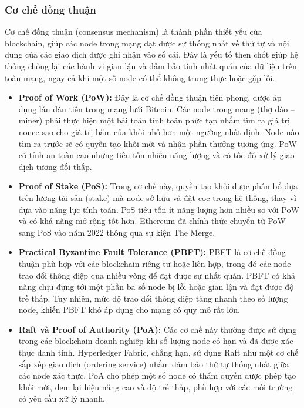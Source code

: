 \subsubsection{Cơ chế đồng thuận}

Cơ chế đồng thuận (consensus mechanism) là thành phần thiết yếu của blockchain, giúp các node trong mạng đạt được sự thống nhất về thứ tự và nội dung của các giao dịch được ghi nhận vào sổ cái. Đây là yếu tố then chốt giúp hệ thống chống lại các hành vi gian lận và đảm bảo tính nhất quán của dữ liệu trên toàn mạng, ngay cả khi một số node có thể không trung thực hoặc gặp lỗi.

\begin{itemize}
    \item \textbf{Proof of Work (PoW):} Đây là cơ chế đồng thuận tiên phong, được áp dụng lần đầu tiên trong mạng lưới Bitcoin. Các node trong mạng (thợ đào -- miner) phải thực hiện một bài toán tính toán phức tạp nhằm tìm ra giá trị nonce sao cho giá trị băm của khối nhỏ hơn một ngưỡng nhất định. Node nào tìm ra trước sẽ có quyền tạo khối mới và nhận phần thưởng tương ứng. PoW có tính an toàn cao nhưng tiêu tốn nhiều năng lượng và có tốc độ xử lý giao dịch tương đối thấp.

    \item \textbf{Proof of Stake (PoS):} Trong cơ chế này, quyền tạo khối được phân bổ dựa trên lượng tài sản (stake) mà node sở hữu và đặt cọc trong hệ thống, thay vì dựa vào năng lực tính toán. PoS tiêu tốn ít năng lượng hơn nhiều so với PoW và có khả năng mở rộng tốt hơn. Ethereum đã chính thức chuyển từ PoW sang PoS vào năm 2022 thông qua sự kiện The Merge.

    \item \textbf{Practical Byzantine Fault Tolerance (PBFT):} PBFT là cơ chế đồng thuận phù hợp với các blockchain riêng tư hoặc liên hợp, trong đó các node trao đổi thông điệp qua nhiều vòng để đạt được sự nhất quán. PBFT có khả năng chịu đựng tới một phần ba số node bị lỗi hoặc gian lận và đạt được độ trễ thấp. Tuy nhiên, mức độ trao đổi thông điệp tăng nhanh theo số lượng node, khiến PBFT khó áp dụng cho mạng có quy mô rất lớn.

    \item \textbf{Raft và Proof of Authority (PoA):} Các cơ chế này thường được sử dụng trong các blockchain doanh nghiệp khi số lượng node có hạn và đã được xác thực danh tính. Hyperledger Fabric, chẳng hạn, sử dụng Raft như một cơ chế sắp xếp giao dịch (ordering service) nhằm đảm bảo thứ tự thống nhất giữa các node xác thực. PoA cho phép một số node có thẩm quyền được phép tạo khối mới, đem lại hiệu năng cao và độ trễ thấp, phù hợp với các môi trường có yêu cầu xử lý nhanh.
\end{itemize}

